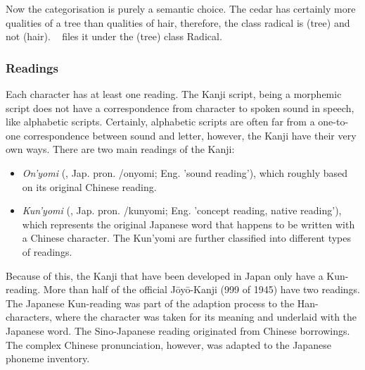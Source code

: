 Now the categorisation is purely a semantic choice. The cedar has certainly more
qualities of a tree than qualities of hair, therefore, the class radical is
 (tree) and not  (hair). 
~\citeyear{Hadamitzky1995} files it under the 
 (tree) class Radical. %


\subsubsection{Readings}
\label{sec:readings}

Each character has at least one reading. The Kanji script, being a morphemic 
script does not have a correspondence from character to spoken sound in speech,
like alphabetic scripts. Certainly, alphabetic scripts are often far from a 
one-to-one correspondence between sound and letter, however, the Kanji have 
their very own ways. There are two main readings of the Kanji: \\ 
\begin{itemize}
  \item \emph{On'yomi} (, Jap. pron. /onyomi; 
        Eng. 'sound reading'), which roughly based on its original Chinese 
        reading.

  \item \emph{Kun'yomi} (, Jap. pron. /kunyomi; 
        Eng. 'concept reading, native reading'), which represents the original 
        Japanese word that happens to be written with a Chinese character. 
        The Kun'yomi are further classified into different types of readings.
\end{itemize}
Because of this, the Kanji that have been developed in Japan only have a 
Kun-reading. More than half of the official Jōyō-Kanji (999 of 1945)
have two readings.
The Japanese Kun-reading was part of the adaption process to the Han-characters,
where the character was taken for its meaning and underlaid with the Japanese
word. The Sino-Japanese reading originated from Chinese borrowings. The 
complex Chinese pronunciation, however, was adapted to the Japanese 
phoneme inventory.

